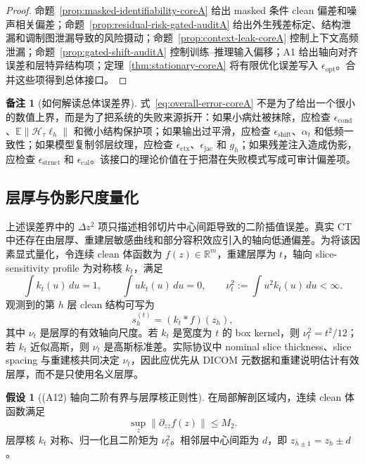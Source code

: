 \documentclass[11pt,a4paper,UTF8,fontset=fandol]{ctexart}
\theoremstyle{definition}
\newtheorem{assumption}[theorem]{假设}
\newtheorem{remark}[theorem]{备注}
\newcommand{\norm}[1]{\left\lVert#1\right\rVert}
\newcommand{\R}{\mathbb{R}}
\newcommand{\E}{\mathbb{E}}
\newcommand{\cH}{\mathcal{H}}
\begin{document}
\begin{proof}
命题~\ref{prop:masked-identifiability-coreA} 给出 masked 条件 clean 偏差和噪声相关偏差；命题~\ref{prop:residual-risk-gated-auditA} 给出外生残差标定、结构泄漏和调制图泄漏导致的风险摄动；命题~\ref{prop:context-leak-coreA} 控制上下文高频泄漏；命题~\ref{prop:gated-shift-auditA} 控制训练--推理输入偏移；A1 给出轴向对齐误差和层特异结构项；定理~\ref{thm:stationary-coreA} 将有限优化误差写入 $\epsilon_{\mathrm{opt}}$。合并这些项得到总体接口。
\end{proof}

\begin{remark}[如何解读总体误差界]
式~\eqref{eq:overall-error-coreA} 不是为了给出一个很小的数值上界，而是为了把系统的失败来源拆开：如果小病灶被抹除，应检查 $\epsilon_{\mathrm{cond}}$、$\E\norm{\cH_\tau\ell_h}$ 和微小结构保护项；如果输出过平滑，应检查 $\epsilon_{\mathrm{shift}}$、$\alpha_t$ 和低频一致性；如果模型复制邻层纹理，应检查 $\epsilon_{\mathrm{ctx}}$、$\epsilon_{\mathrm{jac}}$ 和 $g_h$；如果残差注入造成伪影，应检查 $\epsilon_{\mathrm{struct}}$ 和 $\epsilon_{\mathrm{cal}}$。该接口的理论价值在于把潜在失败模式写成可审计偏差项。
\end{remark}

\subsection{层厚与伪影尺度量化}
\label{sec:thickness-artifact}

上述误差界中的 $\Delta z^2$ 项只描述相邻切片中心间距导致的二阶插值误差。真实 CT 中还存在由层厚、重建层敏感曲线和部分容积效应引入的轴向低通偏差。为将该因素显式量化，令连续 clean 体函数为 $f(z)\in\R^m$，重建层厚为 $t$，轴向 slice-sensitivity profile 为对称核 $k_t$，满足
\begin{equation}
    \int k_t(u)\,du=1,\qquad
    \int u k_t(u)\,du=0,\qquad
    \nu_t^2:=\int u^2 k_t(u)\,du<\infty .
\end{equation}
观测到的第 $h$ 层 clean 结构可写为
\begin{equation}
\label{eq:thick-slice-model}
    s_h^{(t)}=(k_t*f)(z_h),
\end{equation}
其中 $\nu_t$ 是层厚的有效轴向尺度。若 $k_t$ 是宽度为 $t$ 的 box kernel，则 $\nu_t^2=t^2/12$；若 $k_t$ 近似高斯，则 $\nu_t$ 是高斯标准差。实际协议中 nominal slice thickness、slice spacing 与重建核共同决定 $\nu_t$，因此应优先从 DICOM 元数据和重建说明估计有效层厚，而不是只使用名义层厚。

\begin{assumption}[(A12) 轴向二阶有界与层厚核正则性]
在局部解剖区域内，连续 clean 体函数满足
\begin{equation}
    \sup_z\norm{\partial_{zz}f(z)}\le M_2.
\end{equation}
层厚核 $k_t$ 对称、归一化且二阶矩为 $\nu_t^2$。相邻层中心间距为 $d$，即 $z_{h\pm1}=z_h\pm d$。
\end{assumption}
\end{document}
